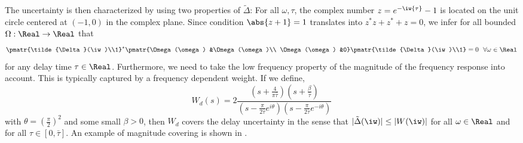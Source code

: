 The uncertainty is then characterized by using two properties of $\tilde \Delta$: For all $\omega,\tau$, the complex number $z=e^{-\iw{\tau}}-1$ is located on the unit circle centered at $(-1,0)$ in the complex plane. Since condition $\abs{z+1}=1$ translates into $z^*z+z^*+z=0$, we infer
for all bounded $\Omega:\Real\to\Real$ that
\begin{equation}
\pmatr{\tilde{\Delta}(\iw)\\1}^*\pmatr{\Omega(\omega) &\Omega(\omega)\\ \Omega(\omega) &0}\pmatr{\tilde{\Delta}(\iw)\\1} = 0\ \ \forall\omega\in\Real
\label{eq:onthecircle}
\end{equation}
for any delay time $\tau\in\Real$. Furthermore, we need to take the low frequency property of the magnitude of the frequency response into account. This is typically captured by a frequency dependent weight. If we define,
\begin{equation*}
W_d(s)= 2\frac{(s+ \frac{4}{\pi\bar{\tau}}) (s+ \frac{\beta}{\bar{\tau}})}{(s-\frac{\pi}{2\bar{\tau}}e^{i\theta})(s-\frac{\pi}{2\bar{\tau}}e^{-i\theta})}
\end{equation*}
with $\theta=\left( \frac{\pi}{2}\right)^2$ and some small $\beta>0$, then $W_d$ covers the delay uncertainty in the sense that $|\tilde{\Delta}(\iw)|\leq |W(\iw)|$ for all $\omega\in\Real$ and for all $\tau\in [0,\bar{\tau}]$. An example of magnitude covering is shown in .

